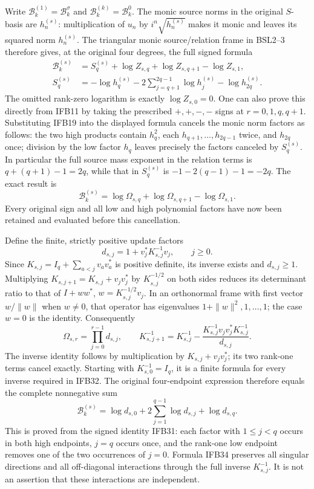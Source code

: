 Write $\mathcal B_k^{(1)}=\mathcal B_k^\sigma$ and
$\mathcal B_k^{(k)}=\mathcal B_k^0$. The monic source norms in the
original $S$-basis are $h_n^{(s)}$: multiplication of $u_n$ by
$i^n\sqrt{h_n^{(s)}}$ makes it monic and leaves its squared norm
$h_n^{(s)}$. The triangular monic source/relation frame in BSL2--3
therefore gives, at the original four degrees, the full signed formula
\[
 \begin{split}
 \mathcal B_k^{(s)}
 &=S_q^{(s)}+\log Z_{s,q}+\log Z_{s,q+1}-\log Z_{s,1},\\
 S_q^{(s)}
 &=-\log h_q^{(s)}-2\sum_{j=q+1}^{2q-1}\log h_j^{(s)}
                                      -\log h_{2q}^{(s)}.
 \end{split}
 \tag{IFB30}
\]
The omitted rank-zero logarithm is exactly $\log Z_{s,0}=0$.
One can also prove this directly from IFB11 by taking the prescribed
$+,+,-,-$ signs at $r=0,1,q,q+1$. Substituting IFB19 into the
displayed formula cancels the monic norm factors as follows:
the two high products contain $h_q^2$, each
$h_{q+1},\ldots,h_{2q-1}$ twice, and $h_{2q}$ once; division by
the low factor $h_q$ leaves precisely the factors canceled by
$S_q^{(s)}$. In particular the full source mass exponent in the
relation terms is $q+(q+1)-1=2q$, while that in $S_q^{(s)}$ is
$-1-2(q-1)-1=-2q$. The exact result is
\[
 \boxed{\mathcal B_k^{(s)}
    =\log\Omega_{s,q}+\log\Omega_{s,q+1}-\log\Omega_{s,1}.}
 \tag{IFB31}
\]
Every original sign and all low and high polynomial factors have
now been retained and evaluated before this cancellation.

Define the finite, strictly positive update factors
\[
 d_{s,j}=1+v_j^*K_{s,j}^{-1}v_j,\qquad j\geq0.
 \tag{IFB32}
\]
Since $K_{s,j}=I_q+\sum_{a<j}v_av_a^*$ is positive definite, its
inverse exists and $d_{s,j}\geq1$. Multiplying
$K_{s,j+1}=K_{s,j}+v_jv_j^*$ by $K_{s,j}^{-1/2}$ on both sides
reduces its determinant ratio to that of $I+ww^*$,
$w=K_{s,j}^{-1/2}v_j$. In an orthonormal frame with first vector
$w/\|w\|$ when $w\ne0$, that operator has eigenvalues
$1+\|w\|^2,1,\ldots,1$; the case $w=0$ is the identity.
Consequently
\[
 \Omega_{s,r}=\prod_{j=0}^{r-1}d_{s,j},\qquad
 K_{s,j+1}^{-1}=K_{s,j}^{-1}
 -\frac{K_{s,j}^{-1}v_jv_j^*K_{s,j}^{-1}}{d_{s,j}}.
 \tag{IFB33}
\]
The inverse identity follows by multiplication by
$K_{s,j}+v_jv_j^*$; its two rank-one terms cancel exactly.
Starting with $K_{s,0}^{-1}=I_q$, it is a finite formula for every
inverse required in IFB32. The original four-endpoint expression
therefore equals the complete nonnegative sum
\[
 \boxed{\displaystyle
 \mathcal B_k^{(s)}
 =\log d_{s,0}+2\sum_{j=1}^{q-1}\log d_{s,j}+\log d_{s,q}.}
 \tag{IFB34}
\]
This is proved from the signed identity IFB31: each factor with
$1\leq j<q$ occurs in both high endpoints, $j=q$ occurs once,
and the rank-one low endpoint removes one of the two occurrences
of $j=0$. Formula IFB34 preserves all singular directions and all
off-diagonal interactions through the full inverse $K_{s,j}^{-1}$.
It is not an assertion that these interactions are independent.

